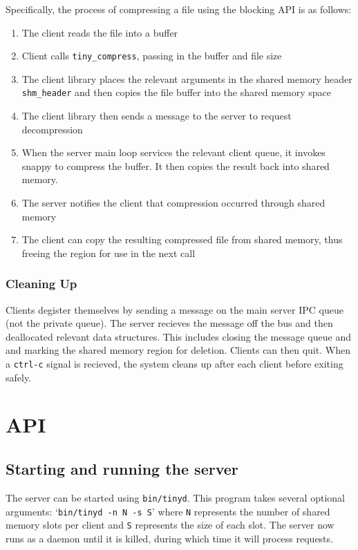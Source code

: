 \documentclass[paper=a4,fontsize=11pt]{report} %
\numberwithin{equation}{section} %
\numberwithin{figure}{section} %
\numberwithin{table}{section} %
\begin{document}
Specifically, the process of compressing a file using the blocking API is as follows:
\begin{enumerate}
\item The client reads the file into a buffer
\item Client calls \texttt{tiny\_compress}, passing in the buffer and file size
\item The client library places the relevant arguments in the shared memory header \texttt{shm\_header} and then copies the file buffer into the shared memory space
\item The client library then sends a message to the server to request decompression
\item When the server main loop services the relevant client queue, it invokes snappy to compress the buffer. It then copies the result back into shared memory.
\item The server notifies the client that compression occurred through shared memory
\item The client can copy the resulting compressed file from shared memory, thus freeing the region for use in the next call
\end{enumerate}

\subsubsection{Cleaning Up}

Clients degister themselves by sending a message on the main server IPC queue (not the private queue). The server recieves the message off the bus and then deallocated relevant data structures. This includes closing the message queue and and marking the shared memory region for deletion. Clients can then quit. When a \texttt{ctrl-c} signal is recieved, the system cleans up after each client before exiting safely.

\section{API}

\subsection{Starting and running the server}
The server can be started using \texttt{bin/tinyd}. This program takes several optional arguments: `\texttt{bin/tinyd -n N -s S}' where \texttt{N} represents the number of shared memory slots per client and \texttt{S} represents the size of each slot. The server now runs as a daemon until it is killed, during which time it will process requests.
\end{document}

